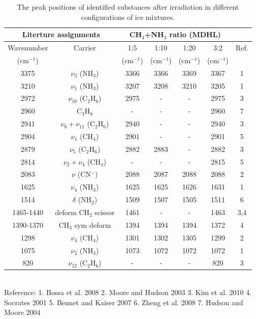 \begin{table}[htbp]
\caption{The peak positions of identified substances after irradiation in different configurations of ice mixtures.}
\label{tab:WavenumberMDHL}
\begin{tabular}{ccccccc}
\hline
\hline
\multicolumn{2}{c}{Literture assignments} & \multicolumn{4}{c}{CH$_4$+NH$_3$ ratio (MDHL)} &  \\
\hline
Wavenumber & Carrier  & 1:5  & 1:10  & 1:20  & 3:2  & Ref. \\
(cm$^{-1}$) &   & (cm$^{-1}$) & (cm$^{-1}$) & (cm$^{-1}$) & (cm$^{-1}$) &\\
\hline
3375 & $\nu_3$ (NH$_3$) & 3366 & 3366 & 3369 & 3367 & 1 \\
3210 & $\nu_1$ (NH$_3$) & 3207 & 3208 & 3210 & 3205 & 1 \\
2972 & $\nu_{10}$ (C$_2$H$_6$) & 2975 & - & - & 2975 & 3 \\
2960 & C$_3$H$_8$ & - & - & - & 2960 & 7 \\
2941 & $\nu_8+\nu_11$ (C$_2$H$_6$) & 2940 & - & - & 2940 & 3 \\
2904 & $\nu_1$ (CH$_4$) & 2901 & - & - & 2901 & 5 \\
2879 & $\nu_5$ (C$_2$H$_6$) & 2882 & 2883 & - & 2882 & 3 \\
2814 & $\nu_2+\nu_4$ (CH$_4$) & - & - & - & 2815 & 5 \\
2083 & $\nu$ (CN$^-$) & 2088 & 2087 & 2088 & 2088 & 2 \\
1625 & $\nu_4$ (NH$_3$) & 1625 & 1625 & 1626 & 1631 & 1 \\
1514 & $\delta$ (NH$_2$) & 1509 & 1507 & 1505 & 1511 & 6 \\
1465-1440 & deform CH$_2$ scissor & 1461 & - & - & 1463 & 3,4 \\
1390-1370 & CH$_3$ sym deform & 1394 & 1394 & 1394 & 1372 & 4 \\
1298 & $\nu_4$ (CH$_4$) & 1301 & 1302 & 1305 & 1299 & 2 \\
1075 & $\nu_2$ (NH$_3$) & 1073 & 1072 & 1072 & 1072 & 1 \\
820 & $\nu_12$ (C$_2$H$_6$) & - & - & - & 820 & 3 \\
\hline
\end{tabular}\\
Reference: 1. Bossa et al. 2008 \cite{bossa2008carbamic} 2. Moore and Hudson 2003 \cite{moore2003infrared} 3. Kim et al. 2010 \cite{kim2010abiotic} 4. Socrates 2001 \cite{socrates2001infrared} 5. Bennet and Kaiser 2007 \cite{bennett2007formation} 6. Zheng et al. 2008 \cite{zheng2008formation} 7. Hudson and Moore 2004 \cite{hudson2004reactions}
\end{table}



